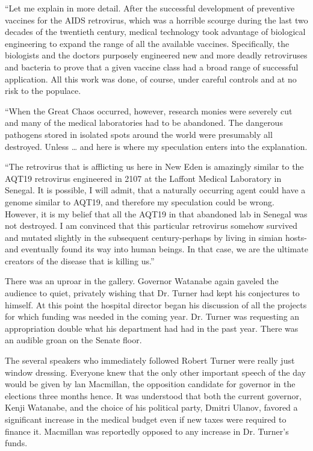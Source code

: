 \documentclass[]{article}
\begin{document}
{“Let me explain in more detail. After the successful development of preventive vaccines for the AIDS retrovirus, which was a horrible scourge during the last two decades of the twentieth century, medical technology took advantage of biological engineering to expand the range of all the available vaccines. Specifically, the biologists and the doctors purposely engineered new and more deadly retroviruses and bacteria to prove that a given vaccine class had a broad range of successful application. All this work was done, of course, under careful controls and at no risk to the populace.

“When the Great Chaos occurred, however, research monies were severely cut and many of the medical laboratories had to be abandoned. The dangerous pathogens stored in isolated spots around the world were presumably all destroyed. Unless … and here is where my speculation enters into the explanation.

“The retrovirus that is afflicting us here in New Eden is amazingly similar to the AQT19 retrovirus engineered in 2107 at the Laffont Medical Laboratory in Senegal. It is possible, I will admit, that a naturally occurring agent could have a genome similar to AQT19, and therefore my speculation could be wrong. However, it is my belief that all the AQT19 in that abandoned lab in Senegal was not destroyed. I am convinced that this particular retrovirus somehow survived and mutated slightly in the subsequent century-perhaps by living in simian hosts-and eventually found its way into human beings. In that case, we are the ultimate creators of the disease that is killing us.”

There was an uproar in the gallery. Governor Watanabe again gaveled the audience to quiet, privately wishing that Dr. Turner had kept his conjectures to himself. At this point the hospital director began his discussion of all the projects for which funding was needed in the coming year. Dr. Turner was requesting an appropriation double what his department had had in the past year. There was an audible groan on the Senate floor.

The several speakers who immediately followed Robert Turner were really just window dressing. Everyone knew that the only other important speech of the day would be given by lan Macmillan, the opposition candidate for governor in the elections three months hence. It was understood that both the current governor, Kenji Watanabe, and the choice of his political party, Dmitri Ulanov, favored a significant increase in the medical budget even if new taxes were required to finance it. Macmillan was reportedly opposed to any increase in Dr. Turner’s funds.

}
\end{document}
